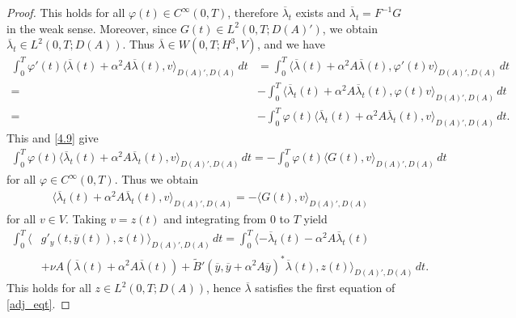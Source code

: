 \documentclass[reqno]{amsart}
\begin{document}
\begin{proof}
		This holds for all $\varphi(t) \in C^{\infty}(0,T)$, therefore $\overline{\lambda}_t$ exists and $\overline{\lambda}_t = F^{-1}G$ in the weak sense. Moreover, since $G(t) \in L^2(0,T;D(A)')$, we obtain $\overline{\lambda}_t \in L^2(0,T;D(A))$. Thus $\overline{\lambda} \in W(0,T;H^3,V)$, and we have
		\begin{align*}
			\int_0^T \varphi'(t)\langle \overline{\lambda}(t) + \alpha^2 A\overline{\lambda}(t),v\rangle_{D(A)',D(A)}\,dt &= \int_0^T \langle \overline{\lambda}(t) + \alpha^2 A\overline{\lambda}(t),\varphi'(t)v\rangle_{D(A)',D(A)}\,dt\\
			=&-\int_0^T \langle \overline{\lambda}_t(t) + \alpha^2 A\overline{\lambda}_t(t),\varphi(t)v\rangle_{D(A)',D(A)}\,dt\\ =&-\int_0^T \varphi(t)\langle \overline{\lambda}_t(t) + \alpha^2 A\overline{\lambda}_t(t),v\rangle_{D(A)',D(A)}\,dt.
		\end{align*}
		This and \eqref{4.9} give 
		\begin{align*}
			\int_0^T \varphi(t)\langle \overline{\lambda}_t(t) + \alpha^2 A\overline{\lambda}_t(t),v\rangle_{D(A)',D(A)}\,dt = -\int_0^T \varphi(t)\langle G(t),v\rangle_{D(A)',D(A)} \,dt
		\end{align*}
		for all $\varphi \in C^{\infty}(0,T)$. Thus we obtain 
		\begin{align*}
			\langle \overline{\lambda}_t(t) + \alpha^2 A\overline{\lambda}_t(t),v\rangle_{D(A)',D(A)} = -\langle G(t),v\rangle_{D(A)',D(A)}
		\end{align*}
		for all $v\in V$. Taking $v=z(t)$ and integrating from $0$ to $T$ yield
		\begin{equation}
			\begin{split}
				\int_0^T  \langle & g'_y(t,\overline{y}(t)), z(t) \rangle_{D(A)',D(A)} \,dt = \int_0^T \langle -\overline{\lambda}_t(t) - \alpha^2 A \overline{\lambda}_t(t)  \\&+ \nu A (\overline{\lambda}(t)+\alpha^2 A\overline{\lambda}(t)) 
				+ \widetilde{B}'(\overline{y},\overline{y} +\alpha^2 A\overline{y})^*\overline{\lambda}(t),z(t)\rangle_{D(A)',D(A)} \,dt. \label{4.13}
			\end{split}
		\end{equation}
		This holds for all $z\in L^2(0,T;D(A))$, hence $\overline{\lambda}$ satisfies the first equation of \eqref{adj_eqt}. 
		

\end{proof}
\end{document}
